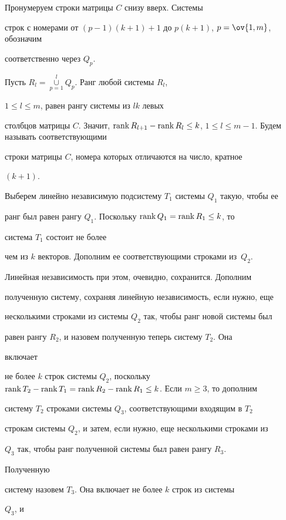 \begin{pf} 


Пронумеруем строки матрицы $C$ снизу вверх. Системы 


строк с номерами от $(p-1)(k+1)+1$ до $p(k+1)$, $p=\ov{1,m}$, обозначим 


соответственно через $Q_p$. 


Пусть $R_l=\mathop{\cup}\limits^l_{p=1}Q_p$. Ранг любой системы $R_l$, 


$1\le l\le m$, равен рангу системы из $l k$ левых 


столбцов матрицы $C$. Значит, $\rank R_{l+1}-\rank R_l\le k$, $1\le 


l\le m-1$. Будем называть соответствующими 


строки матрицы $C$, номера которых отличаются на число, кратное 


$(k+1)$. 


Выберем линейно независимую подсистему $T_1$ системы $Q_1$ такую, чтобы ее 


ранг был равен рангу $Q_1$. Поскольку $\operatorname{rank} Q_1=\operatorname{rank} R_1\le k$, то 


система $T_1$ состоит не более 


чем из $k$ векторов. Дополним ее соответствующими строками из~$Q_2$. 


Линейная независимость при этом, очевидно, сохранится. Дополним 


полученную систему, сохраняя линейную независимость, если нужно, еще 


несколькими строками из системы $Q_2$ так, чтобы ранг новой системы был 


равен рангу $R_2$, и назовем полученную теперь систему $T_2$. Она 


включает 


не более $k$ строк системы $Q_2$, поскольку $\rank T_2-\rank T_1=\rank 


R_2-\rank R_1\le k$. Если $m\ge3$, то дополним 


систему $T_2$ строками системы $Q_3$, соответствующими входящим в $T_2$ 


строкам системы $Q_2$, и затем, если нужно, еще несколькими строками из 


$Q_3$ так, чтобы ранг полученной системы был равен рангу $R_3$. 


Полученную 


систему назовем $T_3$. Она включает не более $k$ строк из системы 


$Q_3$, и 



\end{pf}
